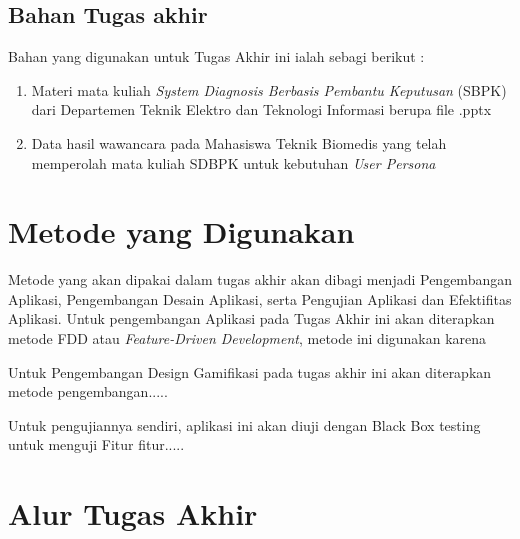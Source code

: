 \subsection{Bahan Tugas akhir}
Bahan yang digunakan untuk Tugas Akhir ini ialah sebagi berikut :
\begin{enumerate}
	\item Materi mata kuliah \textit{System Diagnosis Berbasis Pembantu Keputusan} (SBPK) dari Departemen Teknik Elektro dan Teknologi Informasi berupa file .pptx
	\item Data hasil wawancara pada Mahasiswa Teknik Biomedis yang telah memperolah mata kuliah SDBPK untuk kebutuhan \textit{User Persona}
\end{enumerate}


\section{Metode yang Digunakan}

Metode yang akan dipakai dalam tugas akhir akan dibagi menjadi Pengembangan Aplikasi, Pengembangan Desain Aplikasi, serta Pengujian Aplikasi dan Efektifitas Aplikasi.
Untuk pengembangan Aplikasi pada Tugas Akhir ini akan diterapkan metode FDD atau \textit{Feature-Driven Development}, metode ini digunakan karena

Untuk Pengembangan Design Gamifikasi pada tugas akhir ini akan diterapkan metode pengembangan.....

Untuk pengujiannya sendiri, aplikasi ini akan diuji dengan Black Box testing untuk menguji Fitur fitur.....



\section{Alur Tugas Akhir}

